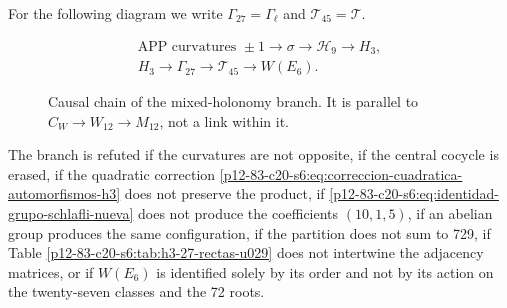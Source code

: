 For the following diagram we write
\(\Gamma_{27}=\Gamma_\ell\) and \(\mathcal T_{45}=\mathcal T\).
\begin{figure}[htbp]
\centering
\[
 \begin{gathered}
 \text{APP curvatures }\pm1
 \longrightarrow\sigma
 \longrightarrow\mathcal H_9
 \longrightarrow H_3,\\[3pt]
 H_3
 \longrightarrow\Gamma_{27}
 \longrightarrow\mathcal T_{45}
 \longrightarrow W(E_6).
 \end{gathered}
\]
\caption{Causal chain of the mixed-holonomy branch. It is parallel to
\(C_W\to W_{12}\to M_{12}\), not a link within it.}
\label{p12-83-c20-s6:fig:cadena-holonomia-e6-u029}
\end{figure}

\begin{criterion}
\label{p12-83-c20-s6:crit:refutacion-rama-e6-u029}
The branch is refuted if the curvatures are not opposite, if the central
cocycle is erased, if the quadratic correction
\eqref{p12-83-c20-s6:eq:correccion-cuadratica-automorfismos-h3} does not preserve the product,
if \eqref{p12-83-c20-s6:eq:identidad-grupo-schlafli-nueva} does not produce the coefficients
\((10,1,5)\), if an abelian group produces the same configuration, if the
partition does not sum to 729, if Table
\ref{p12-83-c20-s6:tab:h3-27-rectas-u029} does not intertwine the adjacency matrices, or if
\(W(E_6)\) is identified solely by its order and not by its action on the
twenty-seven classes and the 72 roots.
\end{criterion}
